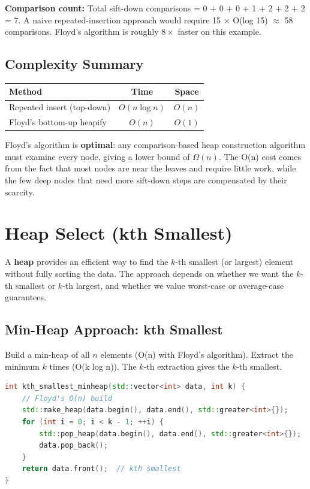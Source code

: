 \textbf{Comparison count:} Total sift-down comparisons = 0 + 0 + 0 + 1 + 2 + 2 + 2 = 7. A naive repeated-insertion approach would require 15 $\times$ O(log 15) $\approx$ 58 comparisons. Floyd's algorithm is roughly $8\times$ faster on this example.

\subsection{Complexity Summary}

\begin{center}
\begin{tabular}{lcc}
\hline
\textbf{Method} & \textbf{Time} & \textbf{Space} \\
\hline
Repeated insert (top-down) & $O(n \log n)$ & $O(n)$ \\
Floyd's bottom-up heapify & $O(n)$ & $O(1)$ \\
\hline
\end{tabular}
\end{center}

Floyd's algorithm is \textbf{optimal}: any comparison-based heap construction algorithm must examine every node, giving a lower bound of $\Omega(n)$. The O(n) cost comes from the fact that most nodes are near the leaves and require little work, while the few deep nodes that need more sift-down steps are compensated by their scarcity.

\section{Heap Select (kth Smallest)}

A \textbf{heap} provides an efficient way to find the $k$-th smallest (or largest) element without fully sorting the data. The approach depends on whether we want the $k$-th smallest or $k$-th largest, and whether we value worst-case or average-case guarantees.

\subsection{Min-Heap Approach: kth Smallest}

Build a min-heap of all $n$ elements (O(n) with Floyd's algorithm). Extract the minimum $k$ times (O(k log n)). The $k$-th extraction gives the $k$-th smallest.

\begin{lstlisting}[language=C++]
int kth_smallest_minheap(std::vector<int> data, int k) {
    // Floyd's O(n) build
    std::make_heap(data.begin(), data.end(), std::greater<int>{});
    for (int i = 0; i < k - 1; ++i) {
        std::pop_heap(data.begin(), data.end(), std::greater<int>{});
        data.pop_back();
    }
    return data.front();  // kth smallest
}
\end{lstlisting}

